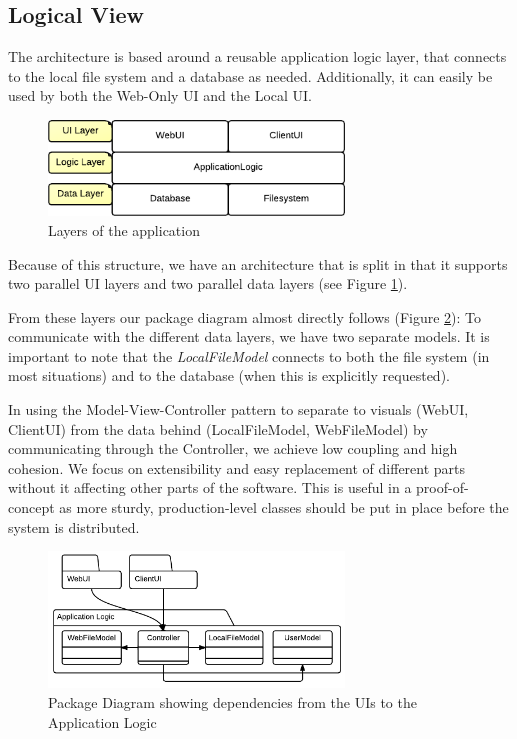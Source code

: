 \subsection{Logical View}
\label{sec:logicalview}

The architecture is based around a reusable application logic layer, that connects to the
local file system and a database as needed. Additionally, it can easily be used by
both the Web-Only UI and the Local UI.

\begin{figure}[htb]
	\centering
	\includegraphics[width=0.7\textwidth]{Software_architecture/graphics/application-layers.png}
	\caption{Layers of the application}
	\label{fig:application-layers}
\end{figure}

Because of this structure, we have an architecture that is split in that it supports two
parallel UI layers and two parallel data layers (see Figure \ref{fig:application-layers}).

From these layers our package diagram almost directly follows (Figure \ref{fig:package-diagram}):
To communicate with the different data layers, we have two separate models. It is important to
note that the \emph{LocalFileModel} connects to both the file system (in most situations) and
to the database (when this is explicitly requested).

In using the Model-View-Controller pattern to separate to visuals (WebUI, ClientUI) from the
data behind (LocalFileModel, WebFileModel) by communicating through the Controller, we achieve
low coupling and high cohesion. We focus on extensibility and easy replacement of different
parts without it affecting other parts of the software. This is useful in a proof-of-concept as
more sturdy, production-level classes should be put in place before the system is distributed.

\begin{figure}[htb]
	\centering
	\includegraphics[width=0.7\textwidth]{Software_architecture/graphics/package-diagram.png}
	\caption{Package Diagram showing dependencies from the UIs to the Application Logic}
	\label{fig:package-diagram}
\end{figure}

